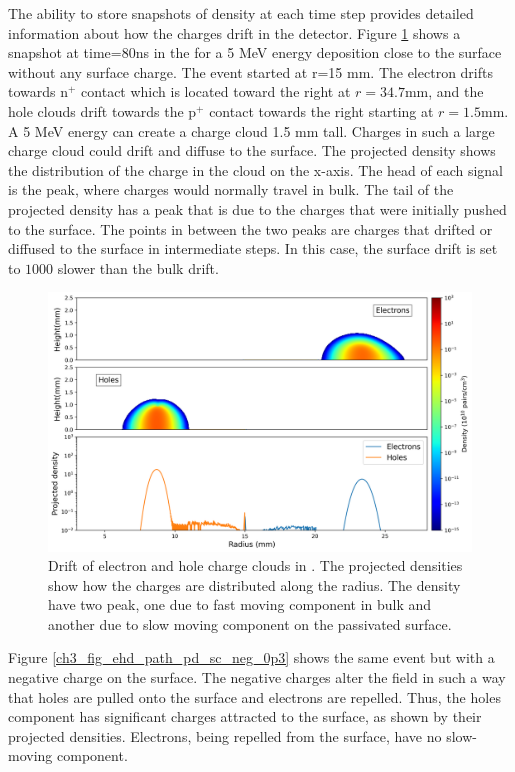 The ability to store snapshots of density at each time step provides detailed information about how the charges drift in the detector. Figure \ref{ch3_fig_ehd_path_pd_sc_0} shows a snapshot at time=$80$ns in the {\ehd} for a 5 MeV energy deposition close to the surface without any surface charge. The event started at r=15 mm. The electron drifts towards n$^+$ contact which is located toward the right at $r=34.7$mm, and the hole clouds drift towards the p$^+$ contact towards the right starting at $r=1.5$mm. A 5 MeV energy can create a charge cloud 1.5 mm tall. Charges in such a large charge cloud could drift and diffuse to the surface. The projected density shows the distribution of the charge in the cloud on the x-axis. The head of each signal is the peak, where charges would normally travel in bulk. The tail of the projected density has a peak that is due to the charges that were initially pushed to the surface. The points in between the two peaks are charges that drifted or diffused to the surface in intermediate steps. In this case, the surface drift is set to $1000$ slower than the bulk drift. 

\begin{figure}%
    \includegraphics[trim={0cm 0 0cm 0},clip,width=0.99\linewidth]{ch3/figs/drift_path_sc=0.0.png}
    \caption{Drift of electron and hole charge clouds in {\ehd}. The projected densities show how the charges are distributed along the radius. The density have two peak, one due to fast moving component in bulk and another due to slow moving component on the passivated surface.}
    \label{ch3_fig_ehd_path_pd_sc_0}
\end{figure}

Figure \ref{ch3_fig_ehd_path_pd_sc_neg_0p3} shows the same event but with a negative charge on the surface. The negative charges alter the field in such a way that holes are pulled onto the surface and electrons are repelled. Thus, the holes component has significant charges attracted to the surface, as shown by their projected densities. Electrons, being repelled from the surface, have no slow-moving component.


